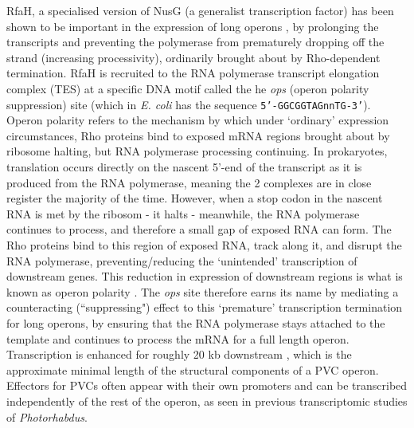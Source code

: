 RfaH, a specialised version of NusG (a generalist transcription factor) has been shown to be important in the expression of long operons \citep{Bailey1996}, by prolonging the transcripts and preventing the polymerase from prematurely dropping off the strand (increasing processivity), ordinarily brought about by Rho-dependent termination. RfaH is recruited to the RNA polymerase transcript elongation complex (TES) at a specific DNA motif called the he \emph{ops} (operon polarity suppression) site (which in \emph{E. coli} has the sequence \texttt{5'-GGCGGTAGnnTG-3'}). Operon polarity refers to the mechanism by which under `ordinary' expression circumstances, Rho proteins bind to exposed mRNA regions brought about by ribosome halting, but RNA polymerase processing continuing. In prokaryotes, translation occurs directly on the nascent 5'-end of the transcript as it is produced from the RNA polymerase, meaning the 2 complexes are in close register the majority of the time. However, when a stop codon in the nascent RNA is met by the ribosom - it halts - meanwhile, the RNA polymerase continues to process, and therefore a small gap of exposed RNA can form. The Rho proteins bind to this region of exposed RNA, track along it, and disrupt the RNA polymerase, preventing/reducing the `unintended' transcription of downstream genes. This reduction in expression of downstream regions is what is known as operon polarity \citep{Santangelo2008, Adhya1974, Banerjee2006, Nudler2002}. The \emph{ops} site therefore earns its name by mediating a counteracting (``suppressing") effect to this `premature' transcription termination for long operons, by ensuring that the RNA polymerase stays attached to the template and continues to process the mRNA for a full length operon. Transcription is enhanced for roughly 20 kb downstream \citep{Artsimovitch2002, Leeds1996, Leeds1997}, which is the approximate minimal length of the structural components of a PVC operon. Effectors for PVCs often appear with their own promoters and can be transcribed independently of the rest of the operon, as seen in previous transcriptomic studies of \emph{Photorhabdus}.


